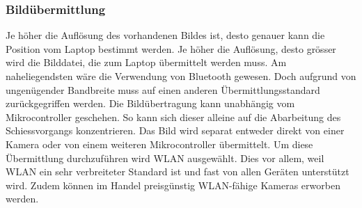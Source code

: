 \subsubsection{Bildübermittlung}
Je höher die Auflösung des vorhandenen Bildes ist, desto genauer kann die 
Position vom Laptop bestimmt werden. Je höher die Auflösung, desto grösser 
wird die Bilddatei, die zum Laptop übermittelt werden muss. Am naheliegendsten 
wäre die Verwendung von Bluetooth gewesen. Doch aufgrund von ungenügender 
Bandbreite muss auf einen anderen Übermittlungsstandard zurückgegriffen 
werden. Die Bildübertragung kann unabhängig vom Mikrocontroller geschehen. So 
kann sich dieser alleine auf die Abarbeitung des Schiessvorgangs 
konzentrieren. Das Bild wird separat entweder direkt von einer Kamera oder von 
einem weiteren Mikrocontroller übermittelt. Um diese Übermittlung 
durchzuführen wird WLAN ausgewählt. Dies vor allem, weil WLAN ein sehr 
verbreiteter Standard ist und fast von allen Geräten unterstützt wird. Zudem 
können im Handel preisgünstig WLAN-fähige Kameras erworben werden.
